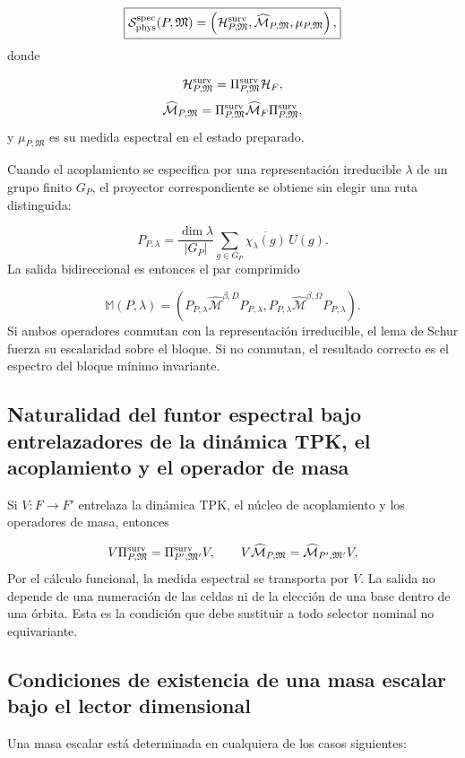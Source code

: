 \[
 \boxed{
 \mathcal S_{\rm phys}^{\rm spec}(P,\mathfrak M)
 =\left(
 \mathcal H_{P,\mathfrak M}^{\rm surv},
 \widehat{\mathcal M}_{P,\mathfrak M},
 \mu_{P,\mathfrak M}
 \right),}
\]
donde

\[
 \mathcal H_{P,\mathfrak M}^{\rm surv}
 =\Pi_{P,\mathfrak M}^{\rm surv}\mathcal H_F,
\]
\[
 \widehat{\mathcal M}_{P,\mathfrak M}
 =\Pi_{P,\mathfrak M}^{\rm surv}
  \widehat{\mathcal M}_F
  \Pi_{P,\mathfrak M}^{\rm surv},
\]
y \(\mu_{P,\mathfrak M}\) es su medida espectral en el estado preparado.

Cuando el acoplamiento se especifica por una representación irreducible \(\lambda\) de un grupo finito \(G_P\), el proyector correspondiente se obtiene sin elegir una ruta distinguida:

\[
 P_{P,\lambda}
 =\frac{\dim\lambda}{|G_P|}
  \sum_{g\in G_P}\overline{\chi_\lambda(g)}\,U(g).
\]
La salida bidireccional es entonces el par comprimido

\[
 \mathbb M(P,\lambda)=
 \left(
 P_{P,\lambda}\widehat{\mathcal M}^{\beta,D}P_{P,\lambda},
 P_{P,\lambda}\widehat{\mathcal M}^{\beta,\Omega}P_{P,\lambda}
 \right).
\]
Si ambos operadores conmutan con la representación irreducible, el lema de Schur fuerza su escalaridad sobre el bloque. Si no conmutan, el resultado correcto es el espectro del bloque mínimo invariante.

\subsection{Naturalidad del funtor espectral bajo entrelazadores de la dinámica TPK, el acoplamiento y el operador de masa}
Si \(V:F\to F'\) entrelaza la dinámica TPK, el núcleo de acoplamiento y los operadores de masa, entonces

\[
 V\Pi_{P,\mathfrak M}^{\rm surv}
 =\Pi_{P',\mathfrak M'}^{\rm surv}V,
 \qquad
 V\widehat{\mathcal M}_{P,\mathfrak M}
 =\widehat{\mathcal M}_{P',\mathfrak M'}V.
\]
Por el cálculo funcional, la medida espectral se transporta por \(V\). La salida no depende de una numeración de las celdas ni de la elección de una base dentro de una órbita. Esta es la condición que debe sustituir a todo selector nominal no equivariante.

\subsection{Condiciones de existencia de una masa escalar bajo el lector dimensional}
Una masa escalar está determinada en cualquiera de los casos siguientes:

